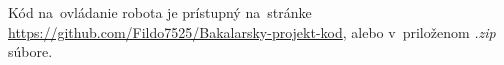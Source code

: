 
Kód na~ovládanie robota je prístupný na~stránke \\
\url{https://github.com/Fildo7525/Bakalarsky-projekt-kod}, alebo v~priloženom \textit{.zip} súbore.
